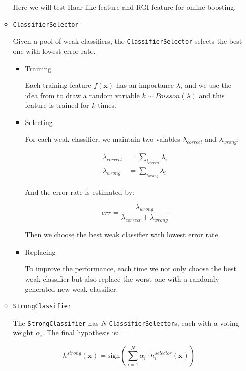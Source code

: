 \documentclass[a4paper]{article}
\begin{document}
\begin{enumerate}
\begin{itemize}
Here we will test Haar-like feature and RGI feature for online boosting.

\item \lstinline{ClassifierSelector}

Given a pool of weak classifiers, the \lstinline{ClassifierSelector} selects the best one with lowest error rate.

\begin{itemize}

\item Training

Each training feature $f(\mathbf{x})$ has an importance $\lambda$, and we use the idea from \cite{Oza01onlinebagging} to draw a random variable $k\sim Poisson(\lambda)$ and this feature is trained for $k$ times.

\item Selecting

For each weak classifier, we maintain two vaiables $\lambda_{correct}$ and $\lambda_{wrong}$:

\begin{subequations}
\begin{align}
\lambda_{correct}&=\sum_{i_{correct}}\lambda_{i}\\
\lambda_{wrong}&=\sum_{i_{wrong}}\lambda_{i}
\end{align}
\end{subequations}

And the error rate is estimated by:

\begin{equation}
err=\frac{\lambda_{wrong}}{\lambda_{correct}+\lambda_{wrong}}
\end{equation}

Then we choose the best weak classifier with lowest error rate.

\item Replacing

To improve the performance, each time we not only choose the best weak classifier but also replace the worst one with a randomly generated new weak classifier.

\end{itemize}

\item \lstinline{StrongClassifier}

The \lstinline{StrongClassifier} has $N$ \lstinline{ClassifierSelector}s, each with a voting weight $\alpha_i$. The final hypothesis is:

\begin{equation}
h^{strong}(\mathbf{x})=\mathrm{sign}(\sum_{i=1}^{N}\alpha_{i}\cdot h^{selector}_{i}(\mathbf{x}))
\end{equation} 


\end{itemize}
\end{enumerate}
\end{document}
